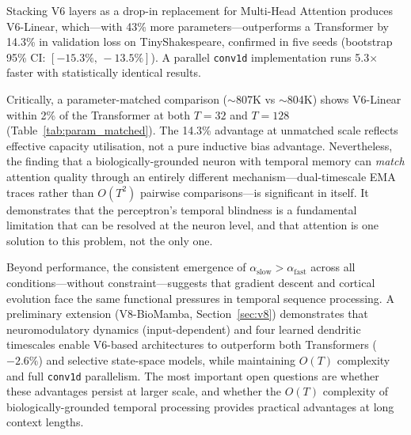 \documentclass[11pt,a4paper]{article}
\begin{document}
Stacking V6 layers as a drop-in replacement for Multi-Head Attention
produces V6-Linear, which---with 43\% more parameters---outperforms
a Transformer by 14.3\% in validation loss on TinyShakespeare, confirmed
in five seeds (bootstrap 95\% CI: $[-15.3\%,\,-13.5\%]$).
A parallel \texttt{conv1d} implementation runs 5.3$\times$ faster
with statistically identical results.

Critically, a parameter-matched comparison ($\sim$807K vs $\sim$804K)
shows V6-Linear within 2\% of the Transformer at both $T=32$ and $T=128$
(Table~\ref{tab:param_matched}).
The 14.3\% advantage at unmatched scale reflects effective capacity
utilisation, not a pure inductive bias advantage.
Nevertheless, the finding that a biologically-grounded neuron with
temporal memory can \emph{match} attention quality through an entirely
different mechanism---dual-timescale EMA traces rather than $O(T^2)$
pairwise comparisons---is significant in itself.
It demonstrates that the perceptron's temporal blindness is a fundamental
limitation that can be resolved at the neuron level, and that attention
is one solution to this problem, not the only one.

Beyond performance, the consistent emergence of
$\alpha_\mathrm{slow} > \alpha_\mathrm{fast}$ across all
conditions---without constraint---suggests that gradient descent
and cortical evolution face the same functional pressures in
temporal sequence processing.
A preliminary extension (V8-BioMamba, Section~\ref{sec:v8})
demonstrates that neuromodulatory dynamics (input-dependent)
and four learned dendritic timescales enable V6-based architectures to
outperform both Transformers ($-2.6\%$) and selective state-space
models, while maintaining $O(T)$ complexity and full
\texttt{conv1d} parallelism.
The most important open questions are whether these advantages
persist at larger scale, and whether the $O(T)$ complexity of
biologically-grounded temporal processing provides practical
advantages at long context lengths.
\end{document}
